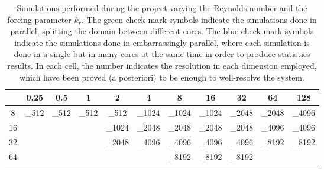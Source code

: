 \documentclass[../main.tex]{subfiles}
\begin{document}
\begin{table}[ht]
	\centering
	\def\tickgreen{\textcolor{color_green3}{\ding{51}}}
	\def\tickblue{\textcolor{color_blue3}{\ding{51}}}
	\setlength{\tabcolsep}{5pt}
	\renewcommand{\arraystretch}{1.5}
	\begin{tabular}{c|cccccccccc}
		\diagbox[width=\dimexpr \textwidth/16+2\tabcolsep\relax, height=1cm]{$k_r$}{$\Re$} & 0.25             & 0.5              & 1                & 2                         & 4                          & 8                          & 16                         & 32                         & 64                & 128               \\
		\hline
		8                                                                                  & \tickgreen_{512} & \tickgreen_{512} & \tickgreen_{512} & \tickgreen\tickblue_{512} & \tickgreen\tickblue_{1024} & \tickgreen\tickblue_{1024} & \tickgreen\tickblue_{1024} & \tickgreen\tickblue_{2048} & \tickgreen_{2048} & \tickgreen_{4096} \\
		16                                                                                 &                  &                  &                  & \tickblue_{1024}          & \tickblue_{2048}           & \tickgreen\tickblue_{2048} & \tickgreen\tickblue_{2048} & \tickgreen\tickblue_{2048} & \tickgreen_{4096} & \tickgreen_{4096} \\
		32                                                                                 &                  &                  &                  & \tickblue_{2048}          & \tickblue_{4096}           & \tickgreen\tickblue_{4096} & \tickgreen\tickblue_{4096} & \tickgreen\tickblue_{4096} & \tickgreen_{8192} & \tickgreen_{8192} \\
		64                                                                                 &                  &                  &                  &                           &                            & \tickgreen_{8192}          & \tickgreen_{8192}          & \tickgreen_{8192}          &                   &                   \\
	\end{tabular}
	\caption{Simulations performed during the project varying the Reynolds number and the forcing parameter $k_r$. The green check mark symbols indicate the simulations done in parallel, splitting the domain between different cores. The blue check mark symbols indicate the simulations done in embarrassingly parallel, where each simulation is done in a single but in many cores at the same time in order to produce statistics results. In each cell, the number indicates the resolution in each dimension employed, which have been proved (a posteriori) to be enough to well-resolve the system.}
	\label{tab:simulations}
\end{table}
\end{document}
